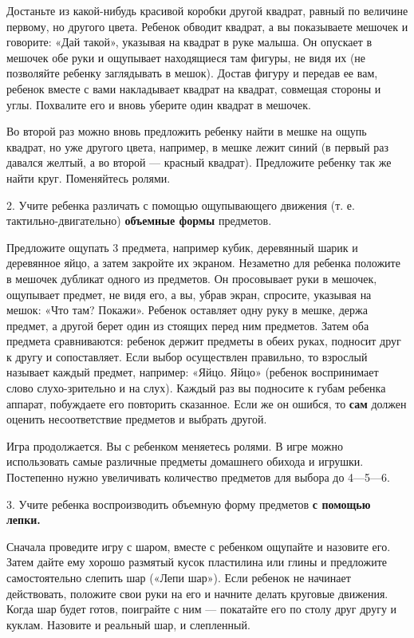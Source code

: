 \documentclass[a5paper]{book}
\begin{document}
Достаньте из какой-нибудь красивой коробки другой квадрат, равный по
величине первому, но другого цвета. Ребенок обводит квадрат, а вы
показываете мешочек и говорите: «Дай такой», указывая на квадрат в руке
малыша. Он опускает в мешочек обе руки и ощупывает находящиеся там
фигуры, не видя их (не позволяйте ребенку заглядывать в мешок). Достав
фигуру и передав ее вам, ребенок вместе с вами накладывает квадрат на
квадрат, совмещая стороны и углы. Похвалите его и вновь уберите один
квадрат в мешочек.

Во второй раз можно вновь предложить ребенку найти в мешке на ощупь
квадрат, но уже другого цвета, например, в мешке лежит синий (в первый
раз давался желтый, а во второй --- красный квадрат). Предложите ребенку
так же найти круг. Поменяйтесь ролями.

2. Учите ребенка различать с помощью ощупывающего движения (т. е.
тактильно-двигательно) \textbf{объемные формы} предметов.

Предложите ощупать 3 предмета, например кубик, деревянный шарик и
деревянное яйцо, а затем закройте их экраном. Незаметно для ребенка
положите в мешочек дубликат одного из предметов. Он просовывает руки в
мешочек, ощупывает предмет, не видя его, а вы, убрав экран, спросите,
указывая на мешок: «Что там? Покажи». Ребенок оставляет одну руку в
мешке, держа предмет, а другой берет один из стоящих перед ним
предметов. Затем оба предмета сравниваются: ребенок держит предметы в
обеих руках, подносит друг к другу и сопоставляет. Если выбор
осуществлен правильно, то взрослый называет каждый предмет, например:
«Яйцо. Яйцо» (ребенок воспринимает слово слухо-зрительно и на слух).
Каждый раз вы подносите к губам ребенка аппарат, побуждаете его
повторить сказанное. Если же он ошибся, то \textbf{сам} должен оценить
несоответствие предметов и выбрать другой.

Игра продолжается. Вы с ребенком меняетесь ролями. В игре можно
использовать самые различные предметы домашнего обихода и игрушки.
Постепенно нужно увеличивать количество предметов для выбора до
4---5---6.

3. Учите ребенка воспроизводить объемную форму предметов \textbf{с
помощью лепки.}

Сначала проведите игру с шаром, вместе с ребенком ощупайте и назовите
его. Затем дайте ему хорошо размятый кусок пластилина или глины и
предложите самостоятельно слепить шар («Лепи шар»). Если ребенок не
начинает действовать, положите свои руки на его и начните делать
круговые движения. Когда шар будет готов, поиграйте с ним --- покатайте
его по столу друг другу и куклам. Назовите и реальный шар, и слепленный.
\end{document}
